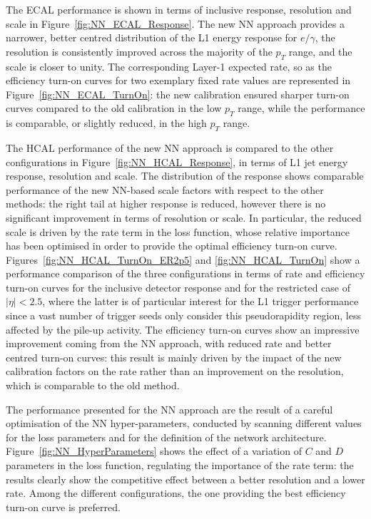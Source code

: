The ECAL performance is shown in terms of inclusive response, resolution and scale in Figure~\ref{fig:NN_ECAL_Response}. The new NN approach provides a narrower, better centred distribution of the L1 energy response for $e/\gamma$, the resolution is consistently improved across the majority of the $p_T$ range, and the scale is closer to unity. The corresponding Layer-1 expected rate, so as the efficiency turn-on curves for two exemplary fixed rate values are represented in Figure~\ref{fig:NN_ECAL_TurnOn}: the new calibration ensured sharper turn-on curves compared to the old calibration in the low $p_T$ range, while the performance is comparable, or slightly reduced, in the high $p_T$ range.

The HCAL performance of the new NN approach is compared to the other configurations in Figure~\ref{fig:NN_HCAL_Response}, in terms of L1 jet energy response, resolution and scale. The distribution of the response shows comparable performance of the new NN-based scale factors with respect to the other methods: the right tail at higher response is reduced, however there is no significant improvement in terms of resolution or scale. In particular, the reduced scale is driven by the rate term in the loss function, whose relative importance has been optimised in order to provide the optimal efficiency turn-on curve. Figures~\ref{fig:NN_HCAL_TurnOn_ER2p5} and \ref{fig:NN_HCAL_TurnOn} show a performance comparison of the three configurations in terms of rate and efficiency turn-on curves for the inclusive detector response and for the restricted case of $|\eta|<2.5$, where the latter is of particular interest for the L1 trigger performance since a vast number of trigger seeds only consider this pseudorapidity region, less affected by the pile-up activity.
The efficiency turn-on curves show an impressive improvement coming from the NN approach, with reduced rate and better centred turn-on curves: this result is mainly driven by the impact of the new calibration factors on the rate rather than an improvement on the resolution, which is comparable to the old method.

\bigbreak

The performance presented for the NN approach are the result of a careful optimisation of the NN hyper-parameters, conducted by scanning different values for the loss parameters and for the definition of the network architecture. Figure~\ref{fig:NN_HyperParameters} shows the effect of a variation of $C$ and $D$ parameters in the loss function, regulating the importance of the rate term: the results clearly show the competitive effect between a better resolution and a lower rate. Among the different configurations, the one providing the best efficiency turn-on curve is preferred.

